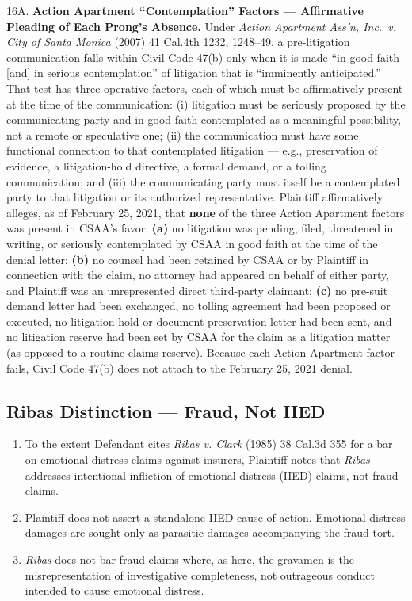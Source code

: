 16A. \textbf{Action Apartment ``Contemplation'' Factors --- Affirmative Pleading of Each Prong's Absence.} Under \emph{Action Apartment Ass'n, Inc.~v. City of Santa Monica} (2007) 41 Cal.4th 1232, 1248--49, a pre-litigation communication falls within Civil Code \textsection{} 47(b) only when it is made ``in good faith {[}and{]} in serious contemplation'' of litigation that is ``imminently anticipated.'' That test has three operative factors, each of which must be affirmatively present at the time of the communication: (i) litigation must be seriously proposed by the communicating party and in good faith contemplated as a meaningful possibility, not a remote or speculative one; (ii) the communication must have some functional connection to that contemplated litigation --- e.g., preservation of evidence, a litigation-hold directive, a formal demand, or a tolling communication; and (iii) the communicating party must itself be a contemplated party to that litigation or its authorized representative. Plaintiff affirmatively alleges, as of February 25, 2021, that \textbf{none} of the three Action Apartment factors was present in CSAA's favor: \textbf{(a)} no litigation was pending, filed, threatened in writing, or seriously contemplated by CSAA in good faith at the time of the denial letter; \textbf{(b)} no counsel had been retained by CSAA or by Plaintiff in connection with the claim, no attorney had appeared on behalf of either party, and Plaintiff was an unrepresented direct third-party claimant; \textbf{(c)} no pre-suit demand letter had been exchanged, no tolling agreement had been proposed or executed, no litigation-hold or document-preservation letter had been sent, and no litigation reserve had been set by CSAA for the claim as a litigation matter (as opposed to a routine claims reserve). Because each Action Apartment factor fails, Civil Code \textsection{} 47(b) does not attach to the February 25, 2021 denial.

\subsection{Ribas Distinction --- Fraud, Not IIED}\label{ribas-distinction-fraud-not-iied}

\begin{enumerate}
\def\labelenumi{\arabic{enumi}.}
\setcounter{enumi}{16}
\item
  To the extent Defendant cites \emph{Ribas v. Clark} (1985) 38 Cal.3d 355 for a bar on emotional distress claims against insurers, Plaintiff notes that \emph{Ribas} addresses intentional infliction of emotional distress (IIED) claims, not fraud claims.
\item
  Plaintiff does not assert a standalone IIED cause of action. Emotional distress damages are sought only as parasitic damages accompanying the fraud tort.
\item
  \emph{Ribas} does not bar fraud claims where, as here, the gravamen is the misrepresentation of investigative completeness, not outrageous conduct intended to cause emotional distress.
\end{enumerate}

